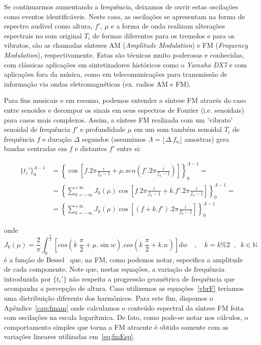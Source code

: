 Se continuarmos aumentando a frequência, deixamos de ouvir estas oscilações
como eventos identificáveis. Neste caso, as oscilações se apresentam na forma de espectro
audível como altura, $f'$, $\mu$ e a forma de onda realizam alterações espectrais no som
original $T_i$ de formas diferentes para os tremolos e para os vibratos, são as 
chamadas sínteses AM (\emph{Amplitude Modulation}) e FM (\emph{Frequency Modulation}), respectivamente.
Estas são técnicas muito poderosas e conhecidas, com clássicas aplicações em sintetizadores
históricos como o \emph{Yamaha DX7} e com aplicações fora da música, como em telecomunicações para transmissão de informação via ondas eletromagnéticas (ex. radios AM e FM).

Para fins musicais e em resumo, podemos entender a síntese FM através do caso entre senoides
e decompor os sinais em seus espectros de Fourier (i.e. senoidais) para casos mais complexos.
Assim, a síntese FM realizada com um 'vibrato' senoidal de frequência $f'$ e profundidade $\mu$ em um som também senoidal $T_i$ de frequência $f$
e duração $\Delta$ segundos (assumimos $\Lambda = \lfloor \Delta . f_a \rfloor $ amostras)
gera bandas centradas em $f$ e distantes $f'$ entre si:

\begin{equation}\label{eq:fmEsp}
\begin{split}
\{t_i'\}_0^{\Lambda -1} & = \left \{ \cos \left [f . 2 \pi \frac{i}{f_a-1} + \mu . sen \left ( f' . 2 \pi \frac{i}{ f_a -1 } \right ) \right ] \right \}_0^{\Lambda-1}  = \\
 & = \left \{ \sum_{k=-\infty}^{+\infty} J_k(\mu) \cos \left [ f . 2 \pi \frac{i}{f_a-1} + k . f' . 2 \pi \frac{i}{f_a-1} \right ]  \right \}_0^{\Lambda-1} = \\
 & = \left \{ \sum_{k=-\infty}^{+\infty} J_k(\mu) \cos \left [ (f+k.f') . 2 \pi \frac{i}{f_a-1} \right ]  \right \}_0^{\Lambda-1}
\end{split}
\end{equation}

onde 
\begin{equation}
J_k(\mu) = \frac{2}{\pi} \int_0^{\frac{\pi}{2}}\left [ cos \left (\overline{k}\;\frac{\pi}{2} + \mu . \sin w \right ) . cos \left ( \overline{k}\;\frac{\pi}{2} + k . w \right ) \right ] dw \quad , \quad \overline{k} = k \% 2 \;\;,\;\; k \in \mathbb{N}
\end{equation}
é a função de Bessel~\cite{BesselCCRMA,JOSFM} que, na FM, como podemos notar, especifica a amplitude de cada componente. Note que, nestas equações, a variação de frequência introduzida por $\{t_i'\}$ não respeita a progressão geométrica de frequência que acompanha a percepção de altura. Caso utilizemos as equações~\ref{vbrF} teríamos uma distribuição diferente dos harmônicos. Para este fim, dispomos o Apêndice~\ref{cap:fmam} onde calculamos o conteúdo espectral da síntese FM feita com oscilações na escala logarítmica. De fato, como pode-se notar nos cálculos, o comportamento simples que torna a FM atraente é obtido somente com as variações lineares utilizadas em~\ref{eq:fmEsp}.

